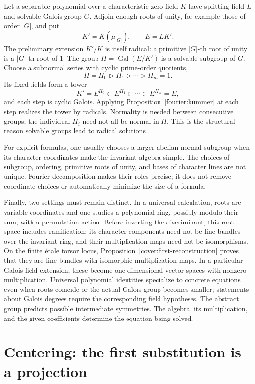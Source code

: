 \documentclass[11pt]{article}
\theoremstyle{remark}
\begin{document}
Let a separable polynomial over a characteristic-zero field \(K\) have splitting field \(L\) and solvable Galois group \(G\). Adjoin enough roots of unity, for example those of order \(|G|\), and put
\[
K'=K(\mu_{|G|}),\qquad E=LK'.
\]
The preliminary extension \(K'/K\) is itself radical: a primitive \(|G|\)-th root of unity is a \(|G|\)-th root of \(1\). The group \(H=\operatorname{Gal}(E/K')\) is a solvable subgroup of \(G\). Choose a subnormal series with cyclic prime-order quotients,
\[
H=H_0\triangleright H_1\triangleright\cdots\triangleright H_m=1.
\]
Its fixed fields form a tower
\[
K'=E^{H_0}\subset E^{H_1}\subset\cdots\subset E^{H_m}=E,
\]
and each step is cyclic Galois. Applying Proposition~\ref{fourier:kummer} at each step realizes the tower by radicals. Normality is needed between consecutive groups; the individual \(H_i\) need not all be normal in \(H\). This is the structural reason solvable groups lead to radical solutions \cite{milne}.

For explicit formulas, one usually chooses a larger abelian normal subgroup when its character coordinates make the invariant algebra simple. The choices of subgroup, ordering, primitive roots of unity, and bases of character lines are not unique. Fourier decomposition makes their roles precise; it does not remove coordinate choices or automatically minimize the size of a formula.

Finally, two settings must remain distinct. In a universal calculation, roots are variable coordinates and one studies a polynomial ring, possibly modulo their sum, with a permutation action. Before inverting the discriminant, this root space includes ramification: its character components need not be line bundles over the invariant ring, and their multiplication maps need not be isomorphisms. On the finite \'etale torsor locus, Proposition~\ref{cover:first-reconstruction} proves that they are line bundles with isomorphic multiplication maps. In a particular Galois field extension, these become one-dimensional vector spaces with nonzero multiplication. Universal polynomial identities specialize to concrete equations even when roots coincide or the actual Galois group becomes smaller; statements about Galois degrees require the corresponding field hypotheses. The abstract group predicts possible intermediate symmetries. The algebra, its multiplication, and the given coefficients determine the equation being solved.

\section{Centering: the first substitution is a projection}
\label{sec:centering}
\end{document}
